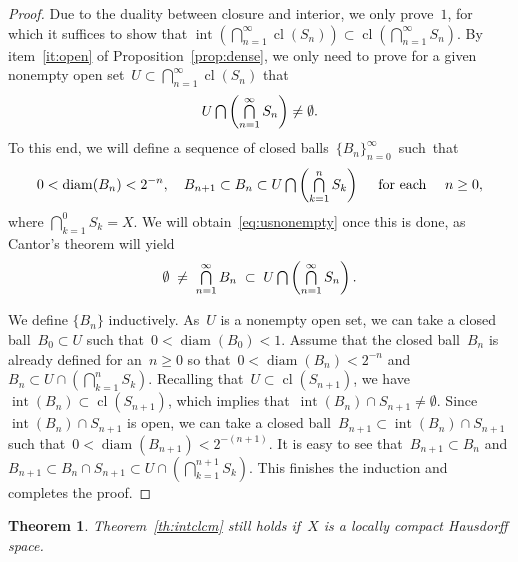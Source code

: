 \documentclass[11pt,a4paper]{article}
\newtheorem{theorem}{Theorem}[section]
\theoremstyle{definition}
\DeclareMathOperator*{\mcap}{\mathsmaller{\bigcap}}
\newcommand{\diam}{\operatorname{diam}}
\DeclareMathOperator{\inter}{int}
\DeclareMathOperator{\cl}{cl}
\numberwithin{equation}{section}
\begin{document}
\begin{proof}
  Due to the duality between closure and interior, we only prove~$1$, for which it suffices to show that 
  $\inter(\bigcap_{n=1}^\infty \cl(S_n))\subset \cl(\bigcap_{n=1}^\infty S_n)$.
  By item~\ref{it:open} of Proposition~\ref{prop:dense}, we only need to prove for a given
  nonempty open set~$U \subset \bigcap_{n=1}^\infty \cl(S_n)$ that%
  \begin{equation}
    \label{eq:usnonempty}
    U\mcap\left(\mcap_{n=1}^\infty S_n\right) \neq \emptyset. 
  \end{equation}
  To this end, we will define a sequence of closed balls~$\{B_n\}_{n=0}^\infty$~such~that%
  \begin{equation}
    \label{eq:nest}
  0< \diam(B_n)< 2^{-n},
  \quad 
  B_{n+1} \subset B_{n} \subset  U\mcap\left(\mcap_{k=1}^n S_k\right)
  \quad \text{ for each } \quad  n \ge 0, 
  \end{equation}
  where $\bigcap_{k=1}^0 S_k=X$. 
  We will obtain~\eqref{eq:usnonempty} once this is done, as
  Cantor's theorem will yield
    \begin{equation}
      \label{eq:nestnonempty}
      \emptyset \;\neq \;\mcap_{n=1}^\infty B_n \;\subset\; U\mcap \left(\mcap_{n=1}^\infty
      S_n\right).
    \end{equation}

    We define $\{B_n\}$ inductively. 
    As~$U$ is a nonempty open set, we can take a closed ball~$B_0\subset U$ 
    such that~$0<\diam(B_0)< 1$.
    Assume that the closed ball~$B_n$ is already defined for an~$n\ge 0$ 
    so that~$0<\diam(B_n)< 2^{-n}$ and~$B_n\subset U\cap(\bigcap_{k=1}^n S_k)$.
    Recalling that~$U\subset\cl(S_{n+1})$, 
    we have~$\inter(B_n)\subset \cl(S_{n+1})$, which implies that~$\inter(B_n) \cap S_{n+1} \neq
    \emptyset$. Since~$\inter(B_n)\cap S_{n+1}$ is open, we  
    can take a closed ball~$B_{n+1}\subset \inter(B_n)\cap S_{n+1}$ such that~$0<\diam(B_{n+1})< 2^{-(n+1)}$.  
    It is easy to see that~$B_{n+1}\subset B_n$ and 
    $B_{n+1}\subset B_{n}\cap S_{n+1} \subset U\cap(\bigcap_{k=1}^{n+1} S_k)$. 
     This finishes the induction and completes the proof.
\end{proof}

\begin{theorem}
  \label{th:intcllch} Theorem~\ref{th:intclcm} still holds if~$X$ is a locally compact Hausdorff
  space. 
\end{theorem}
\end{document}
